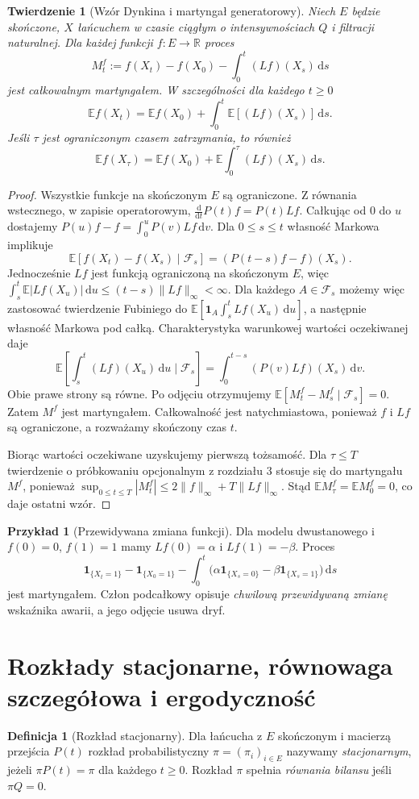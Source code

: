 \documentclass[11pt,a4paper,oneside]{report}
\numberwithin{equation}{chapter}
\theoremstyle{plain}
\newtheorem{twierdzenie}{Twierdzenie}[chapter]
\theoremstyle{definition}
\newtheorem{definicja}{Definicja}[chapter]
\newtheorem{przyklad}{Przykład}[chapter]
\theoremstyle{remark}
\newcommand{\R}{\mathbb{R}}
\newcommand{\E}{\mathbb{E}}
\newcommand{\calF}{\mathcal{F}}
\newcommand{\ind}[1]{\mathbf{1}_{#1}}
\newcommand{\dd}{\mathrm{d}}
\newcommand{\norm}[1]{\lVert #1\rVert}
\begin{document}
\begin{twierdzenie}[Wzór Dynkina i martyngał generatorowy]
\label{thm:dynkin}
Niech $E$ będzie skończone, $X$ łańcuchem w czasie
ciągłym o intensywnościach $Q$ i filtracji naturalnej.
Dla każdej funkcji $f:E\to\R$ proces
\[
M_t^f:=f(X_t)-f(X_0)-\int_0^t (Lf)(X_s)\,\dd s
\]
jest całkowalnym martyngałem.
W szczególności dla każdego $t\ge0$
\[
\E f(X_t)=\E f(X_0)+
\int_0^t\E[(Lf)(X_s)]\,\dd s.
\]
Jeśli $\tau$ jest ograniczonym czasem zatrzymania,
to również
\[
\E f(X_\tau)=\E f(X_0)+
\E\int_0^\tau (Lf)(X_s)\,\dd s.
\]
\end{twierdzenie}
\begin{proof}
Wszystkie funkcje na skończonym $E$ są ograniczone.
Z równania wstecznego, w zapisie operatorowym,
$\frac{\dd}{\dd t}P(t)f=P(t)Lf$.
Całkując od $0$ do $u$ dostajemy
$P(u)f-f=\int_0^u P(v)Lf\,\dd v$.
Dla $0\le s\le t$ własność Markowa implikuje
\[
\E[f(X_t)-f(X_s)\mid\calF_s]
=(P(t-s)f-f)(X_s).
\]
Jednocześnie $Lf$ jest funkcją ograniczoną na skończonym $E$, więc
$\int_s^t\E|Lf(X_u)|\,\dd u\le(t-s)\norm{Lf}_\infty<\infty$.
Dla każdego $A\in\calF_s$ możemy więc zastosować twierdzenie
Fubiniego do $\E[\ind A\int_s^t Lf(X_u)\,\dd u]$,
a następnie własność Markowa pod całką. Charakterystyka
warunkowej wartości oczekiwanej daje
\[
\E\left[\int_s^t(Lf)(X_u)\,\dd u\mid\calF_s\right]
=\int_0^{t-s}(P(v)Lf)(X_s)\,\dd v.
\]
Obie prawe strony są równe. Po odjęciu otrzymujemy
$\E[M_t^f-M_s^f\mid\calF_s]=0$.
Zatem $M^f$ jest martyngałem. Całkowalność jest
natychmiastowa, ponieważ $f$ i $Lf$ są ograniczone,
a rozważamy skończony czas $t$.

Biorąc wartości oczekiwane uzyskujemy pierwszą tożsamość.
Dla $\tau\le T$ twierdzenie o próbkowaniu opcjonalnym
z rozdziału 3 stosuje się do martyngału $M^f$, ponieważ
$\sup_{0\le t\le T}|M_t^f|\le2\norm f_\infty+T\norm{Lf}_\infty$.
Stąd $\E M_\tau^f=\E M_0^f=0$, co daje ostatni wzór.
\end{proof}

\begin{przyklad}[Przewidywana zmiana funkcji]
Dla modelu dwustanowego i $f(0)=0$, $f(1)=1$ mamy
$Lf(0)=\alpha$ i $Lf(1)=-\beta$.
Proces
\[
\ind{\{X_t=1\}}-\ind{\{X_0=1\}}
-\int_0^t\bigl(\alpha\ind{\{X_s=0\}}
-\beta\ind{\{X_s=1\}}\bigr)\,\dd s
\]
jest martyngałem. Człon podcałkowy opisuje
\emph{chwilową przewidywaną zmianę} wskaźnika awarii,
a jego odjęcie usuwa dryf.
\end{przyklad}

\section{Rozkłady stacjonarne, równowaga szczegółowa i ergodyczność}
\begin{definicja}[Rozkład stacjonarny]
Dla łańcucha z $E$ skończonym i macierzą przejścia
$P(t)$ rozkład probabilistyczny $\pi=(\pi_i)_{i\in E}$
nazywamy \emph{stacjonarnym}, jeżeli
$\pi P(t)=\pi$ dla każdego $t\ge0$.
Rozkład $\pi$ spełnia \emph{równania bilansu} jeśli
$\pi Q=0$.
\end{definicja}
\end{document}
